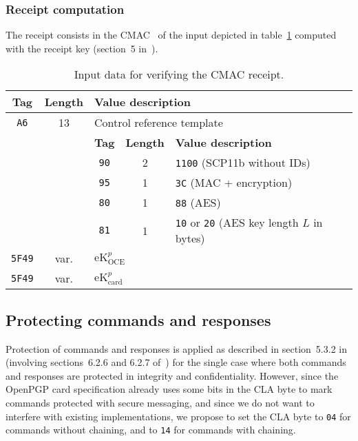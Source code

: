 \documentclass[dvipdfmx,11pt,a4paper,english,final]{article}
\newcommand{\cardekp}[0]{\ensuremath{\mathrm{eK}_\mathrm{card}^p}\xspace}
\newcommand{\oceekp}[0]{\ensuremath{\mathrm{eK}_\mathrm{OCE}^p}\xspace}
\newcommand{\code}[1]{\texttt{#1}\xspace}
\begin{document}
\subsubsection{Receipt computation}

The receipt consists in the CMAC~\cite{nist-cmac} of the input
depicted in table~\ref{tab:auth:resp:cmac} computed with the receipt
key (section~5 in~\cite{gp-card}).

\begin{table}[ht]
  \centering
  \begin{tabular}{|c|c|ccl|}
    \hline
    \textbf{Tag}&\textbf{Length}&\multicolumn{3}{l|}{\textbf{Value description}}\\
    \hline
    \code{A6}&13&\multicolumn{3}{l|}{Control reference template}\\
    \cline{3-5}
                &&\multicolumn{1}{c|}{\textbf{Tag}}&\multicolumn{1}{c|}{\textbf{Length}}&\textbf{Value description}\\
    \cline{3-5}
                &&\multicolumn{1}{c|}{\code{90}}&\multicolumn{1}{c|}{2}&\code{1100} (SCP11b without IDs)\\
                &&\multicolumn{1}{c|}{\code{95}}&\multicolumn{1}{c|}{1}&\code{3C} (MAC + encryption)\\
                &&\multicolumn{1}{c|}{\code{80}}&\multicolumn{1}{c|}{1}&\code{88} (AES)\\
                &&\multicolumn{1}{c|}{\code{81}}&\multicolumn{1}{c|}{1}&\code{10} or \code{20} (AES key length $L$ in bytes)\\
    \hline
    \code{5F49}&var.&\multicolumn{3}{l|}{\oceekp}\\
    \hline
    \code{5F49}&var.&\multicolumn{3}{l|}{\cardekp}\\
    \hline
  \end{tabular}
  \caption{Input data for verifying the CMAC receipt.}
  \label{tab:auth:resp:cmac}
\end{table}





\subsection{Protecting commands and responses}
\label{sec:sm}

Protection of commands and responses is applied as described in
section~5.3.2 in~\cite{gp-scp11} (involving sections~6.2.6 and 6.2.7
of~\cite{gp-scp03}) for the single case where both commands and
responses are protected in integrity and confidentiality. However,
since the OpenPGP card specification already uses some bits in the CLA
byte to mark commands protected with secure messaging, and since we do
not want to interfere with existing implementations, we propose to set
the CLA byte to \code{04} for commands without chaining, and to
\code{14} for commands with chaining.
\end{document}
